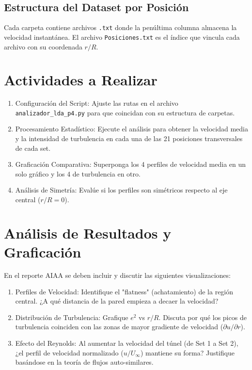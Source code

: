 \documentclass[11pt, a4paper]{article}
\begin{document}
\subsection{Estructura del Dataset por Posición}
Cada carpeta contiene archivos \texttt{.txt} donde la penúltima columna almacena la velocidad instantánea. El archivo \texttt{Posiciones.txt} es el índice que vincula cada archivo con su coordenada $r/R$.

\section{Actividades a Realizar}
\begin{enumerate}
    \item Configuración del Script: Ajuste las rutas en el archivo \texttt{analizador\_lda\_p4.py} para que coincidan con su estructura de carpetas.
    \item Procesamiento Estadístico: Ejecute el análisis para obtener la velocidad media y la intensidad de turbulencia en cada una de las 21 posiciones transversales de cada set.
    \item Graficación Comparativa: Superponga los 4 perfiles de velocidad media en un solo gráfico y los 4 de turbulencia en otro.
    \item Análisis de Simetría: Evalúe si los perfiles son simétricos respecto al eje central ($r/R = 0$).
\end{enumerate}

\section{Análisis de Resultados y Graficación}
En el reporte AIAA se deben incluir y discutir las siguientes visualizaciones:
\begin{enumerate}
    \item Perfiles de Velocidad: Identifique el "flatness" (achatamiento) de la región central. ¿A qué distancia de la pared empieza a decaer la velocidad?
    \item Distribución de Turbulencia: Grafique $e^2$ vs $r/R$. Discuta por qué los picos de turbulencia coinciden con las zonas de mayor gradiente de velocidad ($\partial u / \partial r$).
    \item Efecto del Reynolds: Al aumentar la velocidad del túnel (de Set 1 a Set 2), ¿el perfil de velocidad normalizado ($u/U_\infty$) mantiene su forma? Justifique basándose en la teoría de flujos auto-similares.
\end{enumerate}
\end{document}

